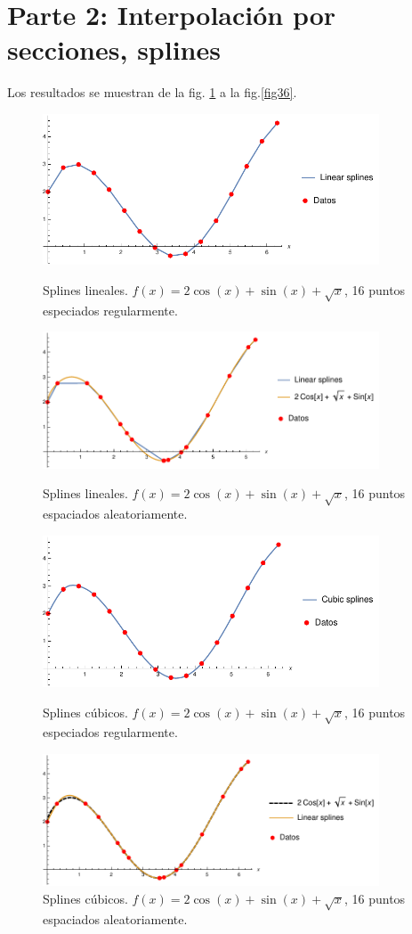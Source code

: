\documentclass[11pt,letterpaper]{article}
\begin{document}
\section{Parte 2: Interpolación por secciones, splines}
Los resultados se muestran de la fig. \ref{fig13} a la fig.\ref{fig36}.
\begin{figure}
\centering
\includegraphics[width=10cm]{img/13.pdf}
\caption{Splines lineales. $f(x)=2\cos (x)+\sin (x)+\sqrt{x}$, 16 puntos especiados regularmente.}
\label{fig13}
\includegraphics[width=10cm]{img/14.pdf}
\caption{Splines lineales. $f(x)=2\cos (x)+\sin (x)+\sqrt{x}$, 16 puntos espaciados aleatoriamente.}
\includegraphics[width=10cm]{img/15.pdf}
\caption{Splines cúbicos. $f(x)=2\cos (x)+\sin (x)+\sqrt{x}$, 16 puntos especiados regularmente.}
\includegraphics[width=10cm]{img/16.pdf}
\caption{Splines cúbicos. $f(x)=2\cos (x)+\sin (x)+\sqrt{x}$, 16 puntos espaciados aleatoriamente.}
\end{figure}
\end{document}
